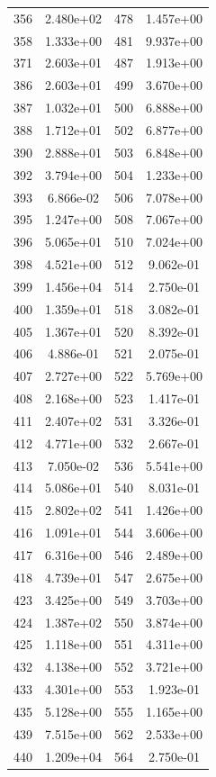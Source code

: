 \documentclass[12pt]{article}
\begin{document}
\begin{longtable}{@{}cccc@{}}
356 & 2.480e+02 & 478 & 1.457e+00 \\
358 & 1.333e+00 & 481 & 9.937e+00 \\
371 & 2.603e+01 & 487 & 1.913e+00 \\
386 & 2.603e+01 & 499 & 3.670e+00 \\
387 & 1.032e+01 & 500 & 6.888e+00 \\
388 & 1.712e+01 & 502 & 6.877e+00 \\
390 & 2.888e+01 & 503 & 6.848e+00 \\
392 & 3.794e+00 & 504 & 1.233e+00 \\
393 & 6.866e-02 & 506 & 7.078e+00 \\
395 & 1.247e+00 & 508 & 7.067e+00 \\
396 & 5.065e+01 & 510 & 7.024e+00 \\
398 & 4.521e+00 & 512 & 9.062e-01 \\
399 & 1.456e+04 & 514 & 2.750e-01 \\
400 & 1.359e+01 & 518 & 3.082e-01 \\
405 & 1.367e+01 & 520 & 8.392e-01 \\
406 & 4.886e-01 & 521 & 2.075e-01 \\
407 & 2.727e+00 & 522 & 5.769e+00 \\
408 & 2.168e+00 & 523 & 1.417e-01 \\
411 & 2.407e+02 & 531 & 3.326e-01 \\
412 & 4.771e+00 & 532 & 2.667e-01 \\
413 & 7.050e-02 & 536 & 5.541e+00 \\
414 & 5.086e+01 & 540 & 8.031e-01 \\
415 & 2.802e+02 & 541 & 1.426e+00 \\
416 & 1.091e+01 & 544 & 3.606e+00 \\
417 & 6.316e+00 & 546 & 2.489e+00 \\
418 & 4.739e+01 & 547 & 2.675e+00 \\
423 & 3.425e+00 & 549 & 3.703e+00 \\
424 & 1.387e+02 & 550 & 3.874e+00 \\
425 & 1.118e+00 & 551 & 4.311e+00 \\
432 & 4.138e+00 & 552 & 3.721e+00 \\
433 & 4.301e+00 & 553 & 1.923e-01 \\
435 & 5.128e+00 & 555 & 1.165e+00 \\
439 & 7.515e+00 & 562 & 2.533e+00 \\
440 & 1.209e+04 & 564 & 2.750e-01 \\

\end{longtable}
\end{document}
